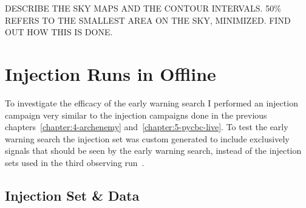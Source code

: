 DESCRIBE THE SKY MAPS AND THE CONTOUR INTERVALS. 50\% REFERS TO THE SMALLEST AREA ON THE SKY, MINIMIZED. FIND OUT HOW THIS IS DONE. 

\section{Injection Runs in Offline}

To investigate the efficacy of the early warning search I performed an injection campaign very similar to the injection campaigns done in the previous chapters~\ref{chapter:4-archenemy} and~\ref{chapter:5-pycbc-live}. To test the early warning search the injection set was custom generated to include exclusively signals that should be seen by the early warning search, instead of the injection sets used in the third observing run~\cite{gwtc3:2023}.

\subsection{Injection Set \& Data}

